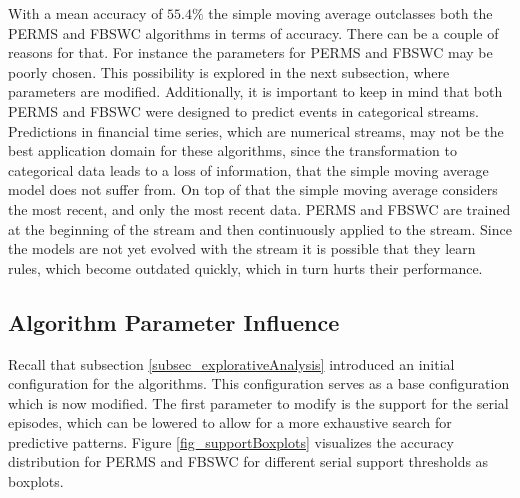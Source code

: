 With a mean accuracy of $55.4\%$ the simple moving average outclasses both the PERMS and FBSWC algorithms in terms of accuracy. There can be a couple of reasons for that. For instance the parameters for PERMS and FBSWC may be poorly chosen. This possibility is explored in the next subsection, where parameters are modified. Additionally, it is important to keep in mind that both PERMS and FBSWC were designed to predict events in categorical streams. Predictions in financial time series, which are numerical streams, may not be the best application domain for these algorithms, since the transformation to categorical data leads to a loss of information, that the simple moving average model does not suffer from. On top of that the simple moving average considers the most recent, and only the most recent data. PERMS and FBSWC are trained at the beginning of the stream and then continuously applied to the stream. Since the models are not yet evolved with the stream it is possible that they learn rules, which become outdated quickly, which in turn hurts their performance.


\subsection{Algorithm Parameter Influence}
Recall that subsection \ref{subsec_explorativeAnalysis} introduced an initial configuration for the algorithms. This configuration serves as a base configuration which is now modified. The first parameter to modify is the support for the serial episodes, which can be lowered to allow for a more exhaustive search for predictive patterns. Figure \ref{fig_supportBoxplots} visualizes the accuracy distribution for PERMS and FBSWC for different serial support thresholds as boxplots.

